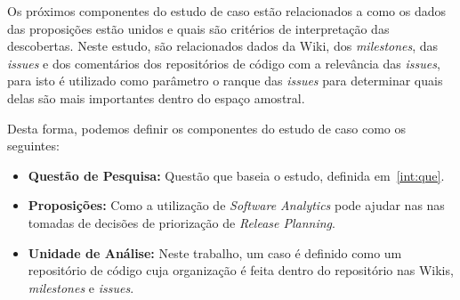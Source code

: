 Os próximos componentes do estudo de caso estão relacionados a como os dados das proposições estão unidos e quais são critérios de interpretação das descobertas. Neste estudo, são relacionados dados da Wiki, dos \textit{milestones}, das \textit{issues} e dos comentários dos repositórios de código com a relevância das \textit{issues}, para isto é utilizado como parâmetro o ranque das \textit{issues} para determinar quais delas 
são mais importantes dentro do espaço amostral.

Desta forma, podemos definir os componentes do estudo de caso como os seguintes:

\begin{itemize}
    \item \textbf{Questão de Pesquisa:} Questão que baseia o estudo, definida em~\ref{int:que}.
    \item \textbf{Proposições:} Como a utilização de \textit{Software Analytics} pode ajudar nas
    nas tomadas de decisões de priorização de \textit{Release Planning}.
    \item \textbf{Unidade de Análise:} Neste trabalho, um caso é definido como um repositório
        de código cuja organização é feita dentro do repositório nas Wikis, \textit{milestones}
        e \textit{issues}.
\end{itemize}
